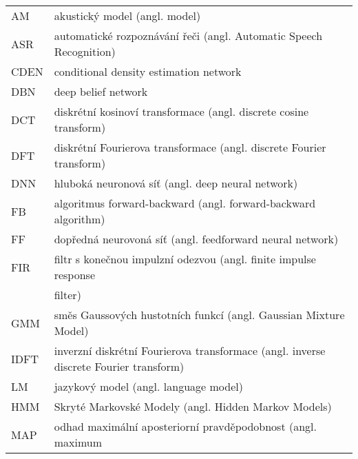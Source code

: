 \hspace{1.3cm}
\begin{longtable}{ll}

AM   & akustický model (angl.  model) \\
ASR  & automatické rozpoznávání řeči (angl. Automatic Speech Recognition) \\
CDEN & conditional density estimation network \\
DBN  & deep belief network \\
DCT  & diskrétní kosinoví transformace (angl. discrete cosine transform) \\
DFT  & diskrétní Fourierova transformace (angl. discrete Fourier transform) \\
DNN  & hluboká neuronová síť (angl. deep neural network) \\
FB   & algoritmus forward-backward (angl. forward-backward algorithm) \\
FF   & dopředná neurovoná síť (angl. feedforward neural network) \\
FIR  & filtr s konečnou impulzní odezvou (angl. finite impulse response \\
     & filter) \\
GMM  & směs Gaussových hustotních funkcí (angl. Gaussian Mixture Model) \\
IDFT  & inverzní diskrétní Fourierova transformace (angl. inverse discrete Fourier transform) \\
LM   & jazykový model (angl. language model) \\
HMM  & Skryté Markovské Modely (angl. Hidden Markov Models) \\
MAP  & odhad maximální aposteriorní pravděpodobnost (angl. maximum \\

\end{longtable}
